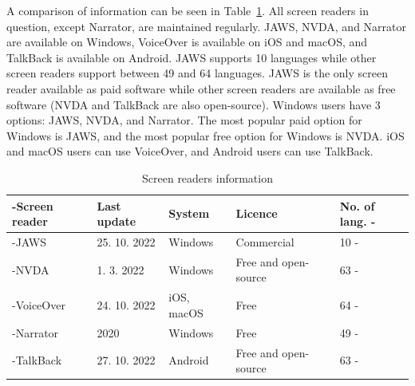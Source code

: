 A comparison of information can be seen in  Table~\ref{tab:screen-readers-info}. All screen readers in question, except Narrator, are maintained regularly. JAWS, NVDA, and Narrator are available on Windows, VoiceOver is available on iOS and macOS, and TalkBack is available on Android. JAWS supports 10 languages while other screen readers support between 49 and 64 languages. JAWS is the only screen reader available as paid software while other screen readers are available as free software (NVDA and TalkBack are also open-source). Windows users have 3 options: JAWS, NVDA, and Narrator. The most popular paid option for Windows is JAWS, and the most popular free option for Windows is NVDA. iOS and macOS users can use VoiceOver, and Android users can use TalkBack.

\begin{table}[tp]
\tablestretch
{}
\centering
\begin{tabularx}{\linewidth}
{>{\kern-\tabcolsep}lllXX<{\kern-\tabcolsep}}
\toprule
\textbf{Screen reader} & \textbf{Last update} & \textbf{System} & \textbf{Licence} & \textbf{No. of lang.} \\
\midrule
JAWS & 25. 10. 2022 & Windows & Commercial & 10 \\
%
NVDA & 1. 3. 2022 & Windows & Free and open-source & 63 \\
%
VoiceOver & 24. 10. 2022 & iOS, macOS & Free & 64 \\
%
Narrator & 2020 & Windows & Free & 49 \\
%
TalkBack & 27. 10. 2022 & Android & Free and open-source & 63 \\
\bottomrule
\end{tabularx}

\caption[Screen Readers Information]
{
Screen readers information
}
\label{tab:screen-readers-info}
\end{table}


